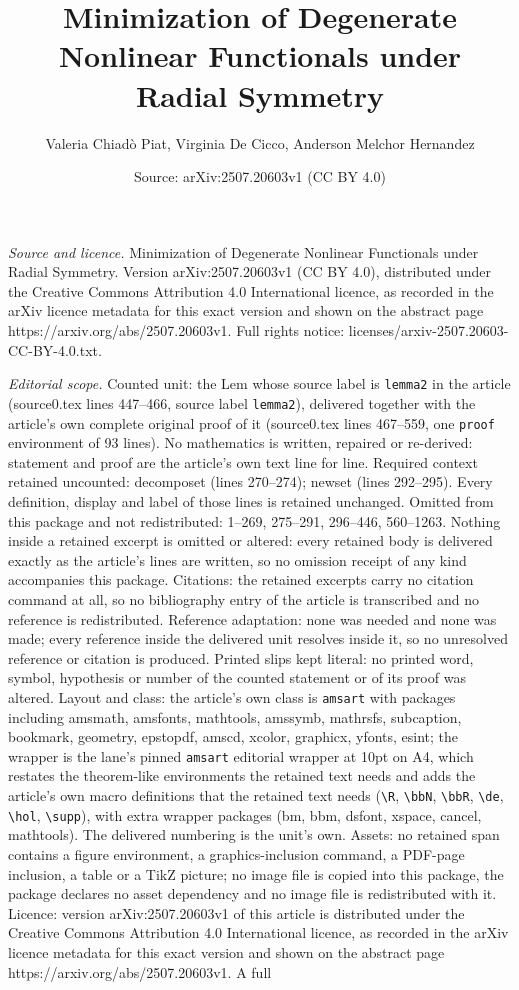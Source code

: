 \documentclass[10pt,a4paper]{amsart}
\title[Minimization of Degenerate Nonlinear Functionals under Radia]{Minimization of Degenerate Nonlinear Functionals under Radial Symmetry}
\author{Valeria Chiad\`o Piat, Virginia De Cicco, Anderson Melchor Hernandez}
\date{Source: arXiv:2507.20603v1 (CC BY 4.0)}
\begin{document}
\maketitle

\noindent\emph{Source and licence.} Minimization of Degenerate Nonlinear Functionals under Radial Symmetry. Version arXiv:2507.20603v1 (CC BY 4.0), distributed under the Creative Commons Attribution 4.0 International licence, as recorded in the arXiv licence metadata for this exact version and shown on the abstract page https://arxiv.org/abs/2507.20603v1. Full rights notice: licenses/arxiv-2507.20603-CC-BY-4.0.txt.\par\smallskip

\noindent\textit{Editorial scope.} Counted unit: the Lem whose source label is \texttt{lemma2} in the article (source0.tex lines 447--466, source label \texttt{lemma2}), delivered together with the article's own complete original proof of it (source0.tex lines 467--559, one \texttt{proof} environment of 93 lines). No mathematics is written, repaired or re-derived: statement and proof are the article's own text line for line. Required context retained uncounted: decomposet (lines 270--274); newset (lines 292--295). Every definition, display and label of those lines is retained unchanged. Omitted from this package and not redistributed: 1--269, 275--291, 296--446, 560--1263. Nothing inside a retained excerpt is omitted or altered: every retained body is delivered exactly as the article's lines are written, so no omission receipt of any kind accompanies this package. Citations: the retained excerpts carry no citation command at all, so no bibliography entry of the article is transcribed and no reference is redistributed. Reference adaptation: none was needed and none was made; every reference inside the delivered unit resolves inside it, so no unresolved reference or citation is produced. Printed slips kept literal: no printed word, symbol, hypothesis or number of the counted statement or of its proof was altered. Layout and class: the article's own class is \texttt{amsart} with packages including amsmath, amsfonts, mathtools, amssymb, mathrsfs, subcaption, bookmark, geometry, epstopdf, amscd, xcolor, graphicx, yfonts, esint; the wrapper is the lane's pinned \texttt{amsart} editorial wrapper at 10pt on A4, which restates the theorem-like environments the retained text needs and adds the article's own macro definitions that the retained text needs (\texttt{\textbackslash R}, \texttt{\textbackslash bbN}, \texttt{\textbackslash bbR}, \texttt{\textbackslash de}, \texttt{\textbackslash hol}, \texttt{\textbackslash supp}), with extra wrapper packages (bm, bbm, dsfont, xspace, cancel, mathtools). The delivered numbering is the unit's own. Assets: no retained span contains a figure environment, a graphics-inclusion command, a PDF-page inclusion, a table or a TikZ picture; no image file is copied into this package, the package declares no asset dependency and no image file is redistributed with it. Licence: version arXiv:2507.20603v1 of this article is distributed under the Creative Commons Attribution 4.0 International licence, as recorded in the arXiv licence metadata for this exact version and shown on the abstract page https://arxiv.org/abs/2507.20603v1. A full 
\end{document}
